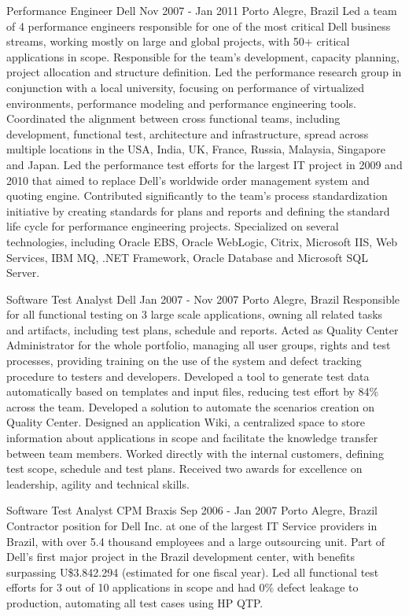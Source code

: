 \documentclass[]{mspier-cv}
\begin{document}
\experienceitem
  {Performance Engineer}
  {Dell}
  {Nov 2007 - Jan 2011}
  {Porto Alegre, Brazil}
  {
    Led a team of 4 performance engineers responsible for one of the most critical Dell business streams, working mostly on large and global projects, with 50+ critical applications in scope.
    Responsible for the team’s development, capacity planning, project allocation and structure definition.
    Led the performance research group in conjunction with a local university, focusing on performance of virtualized environments, performance modeling and performance engineering tools.
    Coordinated the alignment between cross functional teams, including development, functional test, architecture and infrastructure, spread across multiple locations  in the USA, India, UK, France, Russia, Malaysia, Singapore and Japan.
    Led the performance test efforts for the largest IT project in 2009 and 2010 that aimed to replace Dell’s worldwide order management system and quoting engine.
    Contributed significantly to the team’s process standardization initiative by creating standards for plans and reports and defining the standard life cycle for performance engineering projects.
    Specialized on several technologies, including Oracle EBS, Oracle WebLogic, Citrix, Microsoft IIS, Web Services, IBM MQ, .NET Framework, Oracle Database and Microsoft SQL Server.
  }

\experienceitem
  {Software Test Analyst}
  {Dell}
  {Jan 2007 - Nov 2007}
  {Porto Alegre, Brazil}
  {
    Responsible for all functional testing on 3 large scale applications, owning all related tasks and artifacts, including test plans, schedule and reports.
    Acted as Quality Center Administrator for the whole portfolio, managing all user groups, rights and test processes, providing training on the use of the system and defect tracking procedure to testers and developers.
    Developed a tool to generate test data automatically based on templates and input files, reducing test effort by 84\% across the team.
    Developed a solution to automate the scenarios creation on Quality Center.
    Designed an application Wiki, a centralized space to store information about applications in scope and facilitate the knowledge transfer between team members.
    Worked directly with the internal customers, defining test scope, schedule and test plans.
    Received two awards for excellence on leadership, agility and technical skills.
  }

\experienceitem
  {Software Test Analyst}
  {CPM Braxis}
  {Sep 2006 - Jan 2007}
  {Porto Alegre, Brazil}
  {
    Contractor position for Dell Inc. at one of the largest IT Service providers in Brazil, with over 5.4 thousand employees and a large outsourcing unit.
    Part of Dell’s first major project in the Brazil development center, with benefits surpassing U\$3.842.294 (estimated for one fiscal year).
    Led all functional test efforts for 3 out of 10 applications in scope and had 0\% defect leakage to production, automating all test cases using HP QTP.
  }
\end{document}
